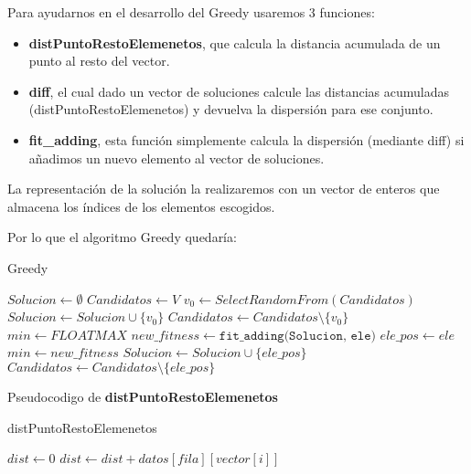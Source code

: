 Para ayudarnos en el desarrollo del Greedy usaremos 3 funciones:\\

\begin{itemize}
  \item \textbf{distPuntoRestoElemenetos}, que calcula la distancia acumulada de un punto al resto del vector.
  \item\textbf{diff}, el cual dado un vector de soluciones calcule las distancias acumuladas (distPuntoRestoElemenetos)
  y devuelva la dispersión para ese conjunto.\\
  \item \textbf{fit\_adding}, esta función simplemente calcula la dispersión (mediante diff) si añadimos un nuevo elemento al vector de soluciones.
\end{itemize}

 
La representación de la solución la realizaremos con un vector de enteros que almacena los índices de los elementos escogidos.
 
Por lo que el algoritmo Greedy quedaría:\\
\begin{algorithm}[H]
  \caption{Greedy}
  \label{Greedy}
  \begin{algorithmic}[1]
      \State $Solucion \gets \emptyset$
      \State $Candidatos \gets V$ 
      \State $v_0 \gets SelectRandomFrom(Candidatos)$
      \State $Solucion \gets Solucion \cup  \{v_0\}$
      \State $Candidatos \gets Candidatos \setminus  \{v_0\}$
          \State $min \gets FLOATMAX$
          \State $new\_fitness \gets \texttt{fit\_adding(Solucion, ele)}$
            \State $ele\_pos \gets ele$ 
            \State $min \gets new\_fitness$ 
          \EndIf
        \EndFor
        \State $Solucion \gets Solucion \cup \{ele\_pos\}$  
        \State $Candidatos \gets Candidatos \setminus  \{ele\_pos\}$

      \EndWhile
      \label{euclidendwhile}
      \State {}
    \EndFunction
  \end{algorithmic}
\end{algorithm}
\newpage
Pseudocodigo de \textbf{distPuntoRestoElemenetos}
\begin{algorithm}[H]
  \caption{distPuntoRestoElemenetos}
  \begin{algorithmic}[1]
      \State $dist \gets 0$
          \State $dist \gets dist + datos[fila][vector[i]]$
        \EndFor
      \label{euclidendwhile}
      \State {}
    \EndFunction
  \end{algorithmic}
\end{algorithm}

